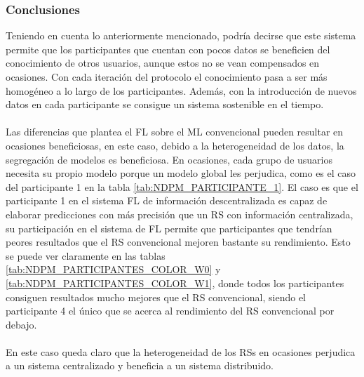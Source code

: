 \subsubsection{Conclusiones}
Teniendo en cuenta lo anteriormente mencionado, podría decirse que este sistema permite que los participantes que cuentan con pocos datos se beneficien del conocimiento de otros usuarios, aunque estos no se vean compensados en ocasiones. Con cada iteración del protocolo el conocimiento pasa a ser más homogéneo a lo largo de los participantes. Además, con la introducción de nuevos datos en cada participante se consigue un sistema sostenible en el tiempo.
\\ \\
Las diferencias que plantea el FL sobre el ML convencional pueden resultar en ocasiones beneficiosas, en este caso, debido a la heterogeneidad de los datos, la segregación de modelos es beneficiosa. En ocasiones, cada grupo de usuarios necesita su propio modelo porque un modelo global les perjudica, como es el caso del participante 1 en la tabla \ref{tab:NDPM_PARTICIPANTE_1}. El caso es que el participante 1 en el sistema FL de información descentralizada es capaz de elaborar predicciones con más precisión que un RS con información centralizada, su participación en el sistema de FL permite que participantes que tendrían peores resultados que el RS convencional mejoren bastante su rendimiento. Esto se puede ver claramente en las tablas \ref{tab:NDPM_PARTICIPANTES_COLOR_W0} y \ref{tab:NDPM_PARTICIPANTES_COLOR_W1}, donde todos los participantes consiguen resultados mucho mejores que el RS convencional, siendo el participante 4 el único que se acerca al rendimiento del RS convencional por debajo. 
\\ \\
En este caso queda claro que la heterogeneidad de los RSs en ocasiones perjudica a un sistema centralizado y beneficia a un sistema distribuido. 